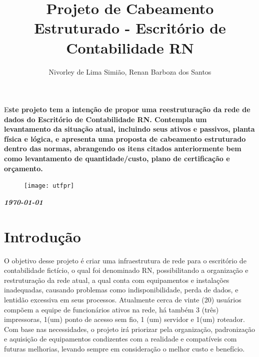 \documentclass[	DIV=calc,%
							paper=a4,%
							fontsize=12pt,%
							onecolumn]{scrartcl}	 					%
\title{Projeto de Cabeamento Estruturado - Escritório de Contabilidade RN}					%
\author{Nivorley de Lima Simião, Renan Barboza dos Santos}  	%
\date{}																				%
\newcommand{\initial}[1]{%
     \lettrine[lines=3,lhang=0.3,nindent=0em]{
     				\color{DarkGoldenrod}
     				{\textsf{#1}}}{}}
\begin{document}
\maketitle
\thispagestyle{fancy} 	
\thispagestyle{empty}		%




\initial{E}\textbf{ste projeto tem a intenção de propor uma reestruturação da rede de dados do Escritório de Contabilidade RN. Contempla um levantamento da situação atual, incluindo seus ativos e passivos, planta física e lógica, e apresenta uma proposta de cabeamento estruturado dentro das normas, abrangendo os itens citados anteriormente bem como levantamento de quantidade/custo, plano de certificação e orçamento.}

\begin{figure}
	\centering
	\texttt{[image: utfpr]}
\end{figure}

\vspace{3cm}
\centerline{\textit{\textbf{\today}}}

\clearpage
    \renewcommand*\listfigurename{Lista de figuras}
\listoffigures





\clearpage
\renewcommand{\contentsname}{Sumário}
\tableofcontents
\clearpage

\section{Introdução}
O objetivo desse projeto é criar uma infraestrutura de rede para o escritório de contabilidade fictício, o qual foi denominado RN, possibilitando a organização e restruturação da rede atual, a qual conta com equipamentos e instalações inadequadas, causando problemas como indisponibilidade, perda de dados, e lentidão excessiva em seus processos. 
Atualmente cerca de vinte (20) usuários compõem a equipe de funcionários ativos na rede, há também 3 (três) impressoras, 1(um) ponto de acesso sem fio, 1 (um) servidor e 1(um) roteador.
Com base nas necessidades, o projeto irá priorizar pela organização, padronização e aquisição de equipamentos condizentes com a realidade e compatíveis com futuras melhorias, levando sempre em consideração o melhor custo e benefício. 
\end{document}
